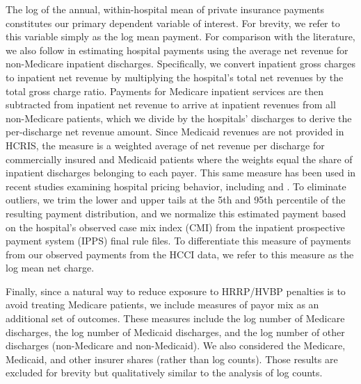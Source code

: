 \documentclass[12pt]{article}
\begin{document}
The log of the annual, within-hospital mean of private insurance payments constitutes our primary dependent variable of interest. For brevity, we refer to this variable simply as the log mean payment. For comparison with the literature, we also follow \cite{dafny2009} in estimating hospital payments using the average net revenue for non-Medicare inpatient discharges. Specifically, we convert inpatient gross charges to inpatient net revenue by multiplying the hospital's total net revenues by the total gross charge ratio. Payments for Medicare inpatient services are then subtracted from inpatient net revenue to arrive at inpatient revenues from all non-Medicare patients, which we divide by the hospitals' discharges to derive the per-discharge net revenue amount. Since Medicaid revenues are not provided in HCRIS, the measure is a weighted average of net revenue per discharge for commercially insured and Medicaid patients where the weights equal the share of inpatient discharges belonging to each payer. This same measure has been used in recent studies examining hospital pricing behavior, including \cite{schmitt2017} and \cite{lewis2015}. To eliminate outliers, we trim the lower and upper tails at the 5th and 95th percentile of the resulting payment distribution, and we normalize this estimated payment based on the hospital's observed case mix index (CMI) from the inpatient prospective payment system (IPPS) final rule files. To differentiate this measure of payments from our observed payments from the HCCI data, we refer to this measure as the log mean net charge.

Finally, since a natural way to reduce exposure to HRRP/HVBP penalties is to avoid treating Medicare patients, we include measures of payor mix as an additional set of outcomes. These measures include the log number of Medicare discharges, the log number of Medicaid discharges, and the log number of other discharges (non-Medicare and non-Medicaid). We also considered the Medicare, Medicaid, and other insurer shares (rather than log counts). Those results are excluded for brevity but qualitatively similar to the analysis of log counts.
\end{document}
